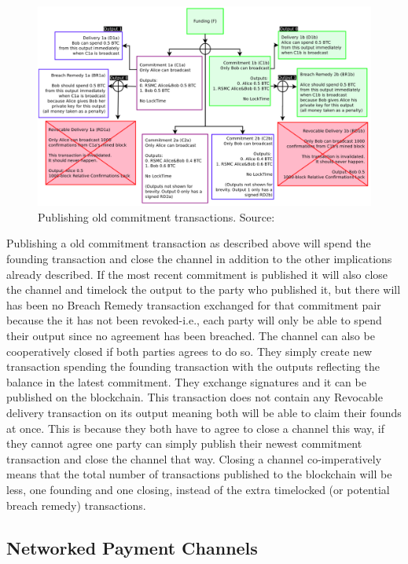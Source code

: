 \begin{figure}[h]
    \centering
    \includegraphics[width=14cm]{figures/ln_breach.png}
    \caption{Publishing old commitment transactions. Source: \cite{poon2015bitcoin}}
    \label{fig:ln_breach}
\end{figure}

Publishing a old commitment transaction as described above will spend the founding transaction and close the channel in addition to the other implications already described. If the most recent commitment is published it will also close the channel and timelock the output to the party who published it, but there will has been no Breach Remedy transaction exchanged for that commitment pair because the it has not been revoked-i.e., each party will only be able to spend their output since no agreement has been breached.
The channel can also be cooperatively closed if both parties agrees to do so. They simply create new transaction spending the founding transaction with the outputs reflecting the balance in the latest commitment. They exchange signatures and it can be published on the blockchain. This transaction does not contain any Revocable delivery transaction on its output meaning both will be able to claim their founds at once. This is because they both have to agree to close a channel this way, if they cannot agree one party can simply publish their newest commitment transaction and close the channel that way.
Closing a channel co-imperatively means that the total number of transactions published to the blockchain will be less, one founding and one closing, instead of the extra timelocked (or potential breach remedy) transactions.

\subsection{Networked Payment Channels}
\label{subsec:networkpcln}

